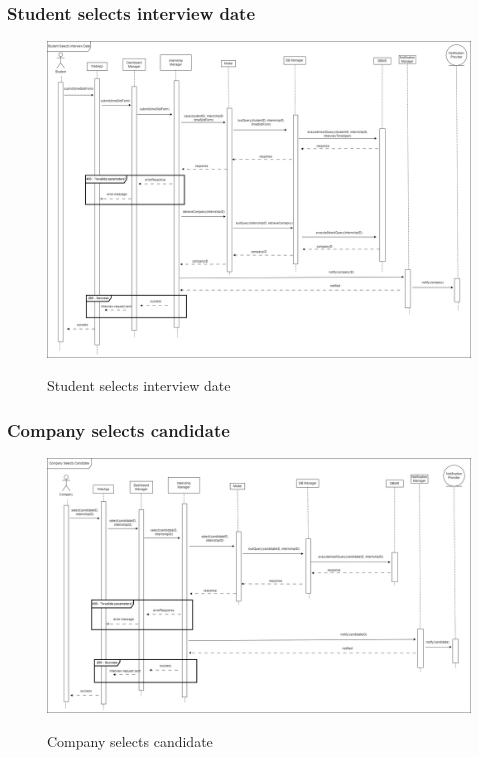 \documentclass[a4paper,12pt]{article}
\begin{document}
\subsubsection*{Student selects interview date}

\begin{figure}[H]
\centering
\includegraphics[scale = 0.30]{DD_figures/RuntimeView/StudentSelectsInterviewDateRV.drawio.png}\\
\caption{Student selects interview date}
\end{figure}

\subsubsection*{Company selects candidate}

\begin{figure}[H]
\centering
\includegraphics[scale = 0.30]{DD_figures/RuntimeView/CompanySelectsCandidateRV.drawio.png}\\
\caption{Company selects candidate}
\end{figure}
\end{document}
